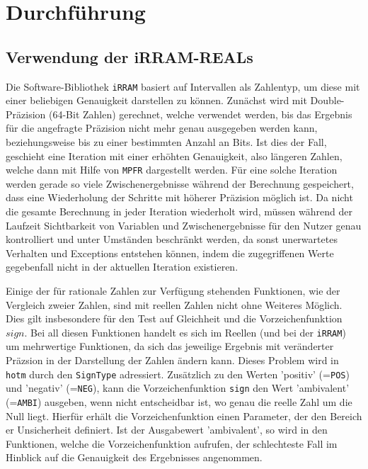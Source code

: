 \chapter{Durchführung}

\section{Verwendung der iRRAM-REALs}
\label{sec:irram}
Die Software-Bibliothek \verb+iRRAM+ \cite{Mller2009EnhancingIE} basiert auf Intervallen als Zahlentyp, um diese mit einer beliebigen Genauigkeit darstellen zu können. Zunächst wird mit Double-Präzision (64-Bit Zahlen) gerechnet, welche verwendet werden, bis das Ergebnis für die angefragte Präzision nicht mehr genau ausgegeben werden kann, beziehungsweise bis zu einer bestimmten Anzahl an Bits. Ist dies der Fall, geschieht eine Iteration mit einer erhöhten Genauigkeit, also längeren Zahlen, welche dann mit Hilfe von \verb+MPFR+ dargestellt werden.
Für eine solche Iteration werden gerade so viele Zwischenergebnisse während der Berechnung gespeichert, dass eine Wiederholung der Schritte mit höherer Präzision möglich ist. Da nicht die gesamte Berechnung in jeder Iteration wiederholt wird, müssen während der Laufzeit Sichtbarkeit von Variablen und Zwischenergebnisse für den Nutzer genau kontrolliert und unter Umständen beschränkt werden, da sonst unerwartetes Verhalten und Exceptions entstehen können, indem die zugegriffenen Werte gegebenfall nicht in der aktuellen Iteration existieren.


Einige der für rationale Zahlen zur Verfügung stehenden Funktionen, wie der Vergleich zweier Zahlen, sind mit reellen Zahlen nicht ohne Weiteres Möglich. Dies gilt insbesondere für den Test auf Gleichheit und die Vorzeichenfunktion $sign$. Bei all diesen Funktionen handelt es sich im Reellen (und bei der \verb+iRRAM+) um mehrwertige Funktionen, da sich das jeweilige Ergebnis mit veränderter Präzsion in der Darstellung der Zahlen ändern kann. Dieses Problem wird in \verb+hotm+ durch den \verb+SignType+ adressiert. Zusätzlich zu den Werten 'positiv' (=\verb+POS+) und 'negativ' (=\verb+NEG+),  kann die Vorzeichenfunktion \verb+sign+ den Wert 'ambivalent' (=\verb+AMBI+) ausgeben, wenn nicht entscheidbar ist, wo genau die reelle Zahl um die Null liegt. Hierfür erhält die Vorzeichenfunktion einen Parameter, der den Bereich er Unsicherheit definiert. Ist der Ausgabewert 'ambivalent', so wird in den Funktionen, welche die Vorzeichenfunktion aufrufen, der schlechteste Fall im Hinblick auf die Genauigkeit des Ergebnisses angenommen. 


